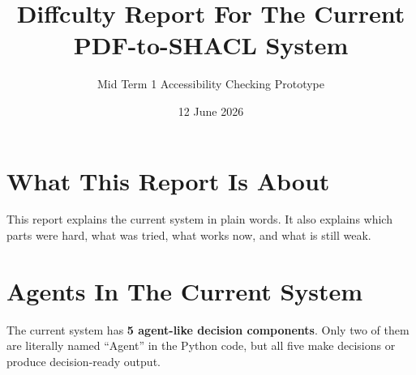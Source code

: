 \documentclass[11pt,a4paper]{article}
\title{Diffculty Report For The Current PDF-to-SHACL System}
\author{Mid Term 1 Accessibility Checking Prototype}
\date{12 June 2026}
\begin{document}
\maketitle

\section{What This Report Is About}
This report explains the current system in plain words. It also explains which parts were hard, what was tried, what works now, and what is still weak.

\section{Agents In The Current System}
The current system has \textbf{5 agent-like decision components}. Only two of them are literally named ``Agent'' in the Python code, but all five make decisions or produce decision-ready output.
\end{document}
